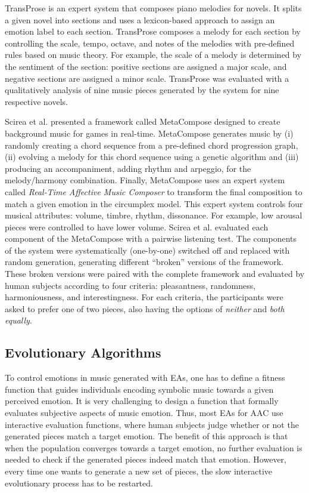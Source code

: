 TransProse \cite{davis2014generating} is an expert system that composes piano melodies for novels. It splits a given novel into sections and uses a lexicon-based approach to assign an emotion label to each section. TransProse composes a melody for each section by controlling the scale, tempo, octave, and notes of the melodies with pre-defined rules based on music theory. For example, the scale of a melody is determined by the sentiment of the section: positive sections are assigned a major scale, and negative sections are assigned a minor scale. TransProse was evaluated with a qualitatively analysis of nine music pieces generated by the system for nine respective novels.

Scirea et al. \cite{scirea2017affective} presented a framework called MetaCompose designed to create background music for games in real-time. MetaCompose generates music by (i) randomly creating a chord sequence from a pre-defined chord progression graph, (ii) evolving a melody for this chord sequence using a genetic algorithm and (iii) producing an accompaniment, adding rhythm and arpeggio, for the melody/harmony combination. Finally, MetaCompose uses an expert system called \textit{Real-Time Affective Music Composer} to transform the final composition to match a given emotion in the circumplex model. This expert system controls four musical attributes: volume, timbre, rhythm, dissonance. For example, low arousal pieces were controlled to have lower volume. Scirea et al. \cite{scirea2017affective} evaluated each component of the MetaCompose with a pairwise listening test. The components of the system were systematically (one-by-one) switched off and replaced with random generation, generating different ``broken'' versions of the framework. These broken versions were paired with the complete framework and evaluated by human subjects according to four criteria: pleasantness, randomness, harmoniousness, and interestingness. For each criteria, the participants were asked to prefer one of two pieces, also having the options of \textit{neither} and \textit{both equally}.

\subsection{Evolutionary Algorithms}

To control emotions in music generated with EAs, one has to define a fitness function that guides individuals encoding symbolic music towards a given perceived emotion. It is very challenging to design a function that formally evaluates subjective aspects of music emotion. Thus, most EAs for AAC use interactive evaluation functions, where human subjects judge whether or not the generated pieces match a target emotion. The benefit of this approach is that when the population converges towards a target emotion, no further evaluation is needed to check if the generated pieces indeed match that emotion.
However, every time one wants to generate a new set of pieces, the slow interactive evolutionary process
has to be restarted.

